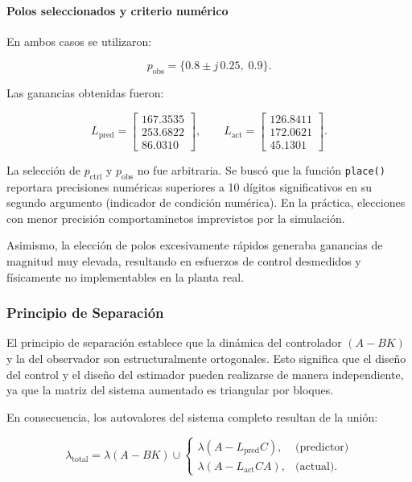 \paragraph{Polos seleccionados y criterio numérico}

En ambos casos se utilizaron:

\[
p_{\text{obs}}=\{0.8\pm j\,0.25,\;0.9\}.
\]

Las ganancias obtenidas fueron:

\[
L_{\text{pred}}=
\begin{bmatrix}
	167.3535\\
	253.6822\\
	86.0310
\end{bmatrix},
\qquad
L_{\text{act}}=
\begin{bmatrix}
	126.8411\\
	172.0621\\
	45.1301
\end{bmatrix}.
\]

La selección de $p_{\text{ctrl}}$ y $p_{\text{obs}}$ no fue arbitraria.
Se buscó que la función \texttt{place()} reportara precisiones numéricas
superiores a 10 dígitos significativos en su segundo argumento
(indicador de condición numérica). En la práctica, elecciones con menor
precisión comportaminetos imprevistos por la simulación.

Asimismo, la elección de polos excesivamente rápidos generaba
ganancias de magnitud muy elevada, resultando en esfuerzos de control
desmedidos y físicamente no implementables en la planta real.

\subsubsection{Principio de Separación}

El principio de separación establece que la dinámica del controlador
$(A-BK)$ y la del observador son estructuralmente ortogonales.
Esto significa que el diseño del control y el diseño del estimador
pueden realizarse de manera independiente, ya que la matriz del sistema
aumentado es triangular por bloques.

En consecuencia, los autovalores del sistema completo resultan de la unión:

\[
\lambda_{\text{total}}
=
\lambda(A-BK)
\cup
\begin{cases}
	\lambda(A-L_{\text{pred}}C), & \text{(predictor)} \\
	\lambda(A-L_{\text{act}}CA), & \text{(actual)}.
\end{cases}
\]

